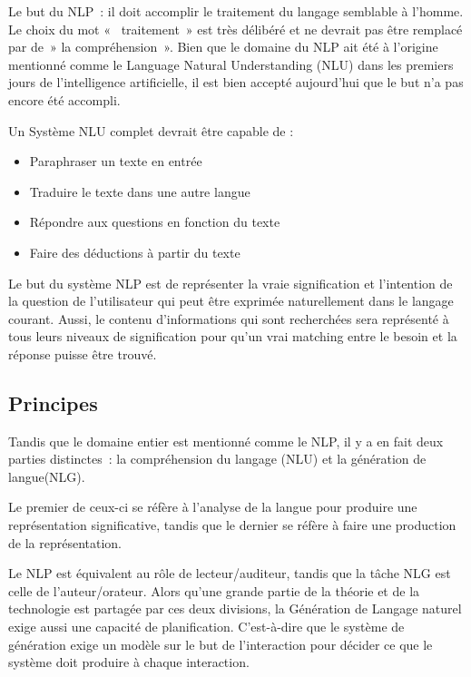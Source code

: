 Le but du NLP : il doit accomplir le traitement du langage semblable à l'homme. Le choix du mot «  traitement » est très délibéré et ne devrait pas être remplacé par de » la compréhension ». Bien que le domaine du NLP ait été à l'origine mentionné comme le Language Natural Understanding (NLU) dans les premiers jours de l’intelligence artificielle, il est bien accepté aujourd'hui que le but n'a pas encore été accompli. 
\vspace{1em}

Un Système NLU complet devrait être capable de :
\vspace{1em}

\begin{itemize}
	\item Paraphraser un texte en entrée
	\item Traduire le texte dans une autre langue 
	\item Répondre aux questions en fonction du texte 
	\item Faire des déductions à partir du texte
\end{itemize}
\vspace{1em}

	Le but du système NLP est de représenter la vraie signification et l'intention de la question de l'utilisateur qui peut être exprimée naturellement dans le langage courant. Aussi, le contenu d’informations qui sont recherchées sera représenté à tous leurs niveaux de signification pour qu'un vrai matching entre le besoin et la réponse puisse être trouvé.


\subsection{Principes}

	Tandis que le domaine entier est mentionné comme le NLP, il y a en fait deux parties distinctes :  la compréhension du langage (NLU) et la génération de langue(NLG).
	\vspace{1em}
	
	Le premier de ceux-ci se réfère à l'analyse de la langue pour produire une représentation significative, tandis que le dernier se réfère à faire une production de la représentation. 
	\vspace{1em}
	
	Le NLP est équivalent au rôle de lecteur/auditeur, tandis que la tâche NLG est celle de l'auteur/orateur. Alors qu'une grande partie de la théorie et de la technologie est partagée par ces deux divisions, la Génération de Langage naturel exige aussi une capacité de planification. C'est-à-dire que le système de génération exige un modèle sur le but de l'interaction pour décider ce que le système doit produire à chaque interaction.
\vspace{1em}


